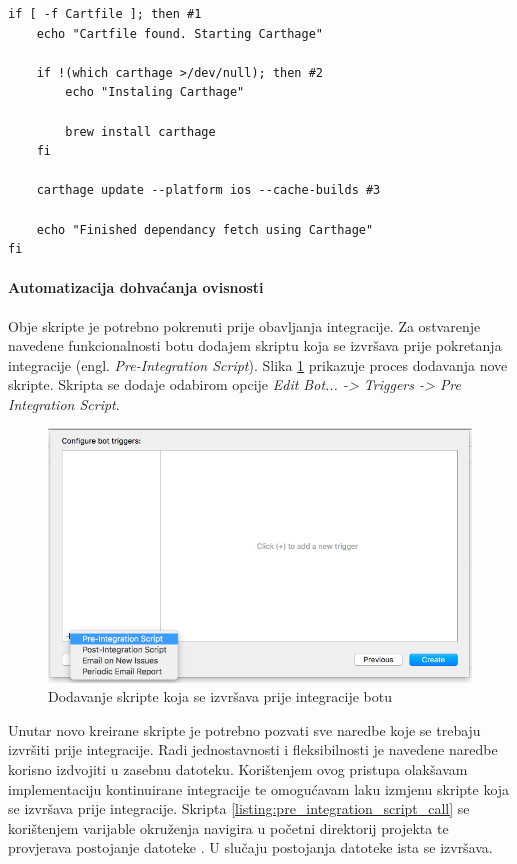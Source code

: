 \documentclass[times, utf8, diplomski, numeric]{fer}
\newcommand{\eng}[1]{(engl. \textit{#1})}
\begin{document}
\begin{lstlisting}[caption=Dohvat ovisnosti korištenjem alata Carthage, label=listing:carthage]
if [ -f Cartfile ]; then #1
    echo "Cartfile found. Starting Carthage"

    if !(which carthage >/dev/null); then #2
        echo "Instaling Carthage"

        brew install carthage
    fi

    carthage update --platform ios --cache-builds #3

    echo "Finished dependancy fetch using Carthage"
fi
\end{lstlisting}

\paragraph{Automatizacija dohvaćanja ovisnosti}

Obje skripte je potrebno pokrenuti prije obavljanja integracije. Za ostvarenje navedene funkcionalnosti botu dodajem skriptu koja se izvršava prije pokretanja integracije \eng{Pre-Integration Script}. Slika \ref{fig:PreIntegrationScript} prikazuje proces dodavanja nove skripte. Skripta se dodaje odabirom opcije \textit{Edit Bot... -> Triggers -> Pre Integration Script}.

\begin{figure}[b!]
\centering
\includegraphics[scale=0.5]{PreIntegrationScript}
\caption{Dodavanje skripte koja se izvršava prije integracije botu}
\label{fig:PreIntegrationScript}
\end{figure}

Unutar novo kreirane skripte je potrebno pozvati sve naredbe koje se trebaju izvršiti prije integracije. Radi jednostavnosti i fleksibilnosti je navedene naredbe korisno izdvojiti u zasebnu datoteku. Korištenjem ovog pristupa olakšavam implementaciju kontinuirane integracije te omogućavam laku izmjenu skripte koja se izvršava prije integracije. Skripta \ref{listing:pre_integration_script_call} se korištenjem  varijable okruženja navigira u početni direktorij projekta te provjerava postojanje datoteke . U slučaju postojanja datoteke ista se izvršava.
\end{document}
